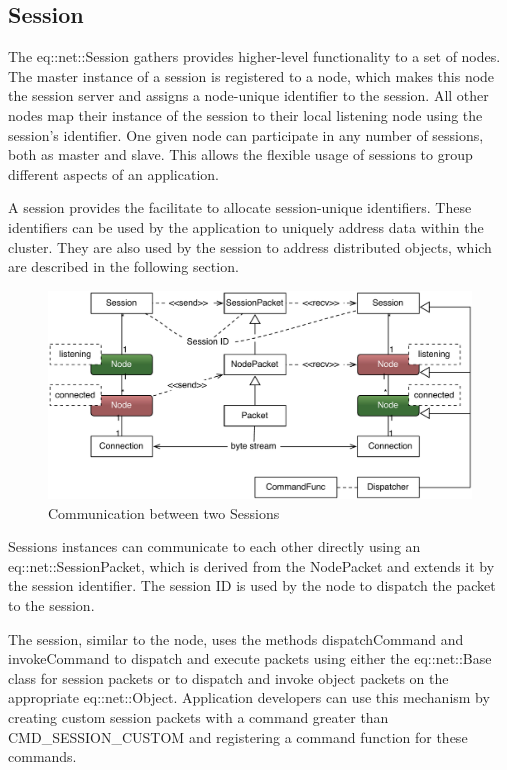 \documentclass[10pt,a4]{scrartcl}
\begin{document}
\subsection{Session}

The \textsf{eq::net::Session} gathers provides higher-level
functionality to a set of nodes. The master instance of a session is
registered to a node, which makes this node the session server and
assigns a node-unique identifier to the session. All other nodes map
their instance of the session to their local listening node using the
session's identifier. One given node can participate in any number of
sessions, both as master and slave. This allows the flexible usage of
sessions to group different aspects of an application.

A session provides the facilitate to allocate session-unique
identifiers. These identifiers can be used by the application to
uniquely address data within the cluster. They are also used by the
session to address distributed objects, which are described in the
following section.

\begin{figure}
  \includegraphics[width=.618\textwidth]{images/netSession.pdf}
  {\caption{\label{fNetSession}Communication between two Sessions}}
\end{figure}
Sessions instances can communicate to each other directly using an
\textsf{eq::net::Ses\-sion\-Packet}, which is derived from the
\textsf{NodePacket} and extends it by the session identifier. The
session ID is used by the node to dispatch the packet to the session.

The session, similar to the node, uses the methods
\textsf{dispatchCommand} and \textsf{invokeCommand} to dispatch and
execute packets using either the \textsf{eq::net::Base} class for
session packets or to dispatch and invoke object packets on the
appropriate \textsf{eq::net::Object}. Application developers can use
this mechanism by creating custom session packets with a command greater
than \textsf{CMD\_SESSION\_CUSTOM} and registering a command function
for these commands.
\end{document}

